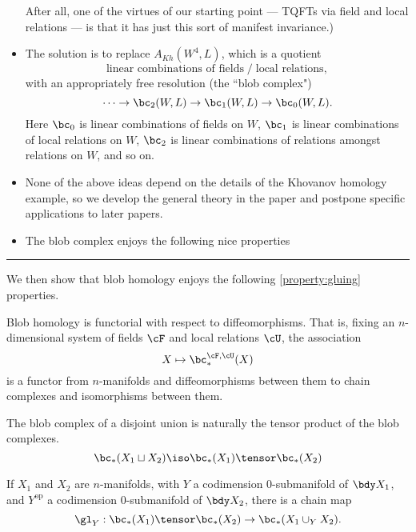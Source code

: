 \documentclass[11pt,leqno]{amsart}
\begin{document}
\begin{itemize}
After all, one of the virtues of our starting point --- TQFTs via field and local relations ---
is that it has just this sort of manifest invariance.)
\item The solution is to replace $A_{Kh}(W^4, L)$, which is a quotient
\[
 \text{linear combinations of fields} \;\big/\; \text{local relations} ,
\]
with an appropriately free resolution (the ``blob complex")
\[
	\cdots\to \bc_2(W, L) \to \bc_1(W, L) \to \bc_0(W, L) .
\]
Here $\bc_0$ is linear combinations of fields on $W$,
$\bc_1$ is linear combinations of local relations on $W$,
$\bc_2$ is linear combinations of relations amongst relations on $W$,
and so on.
\item None of the above ideas depend on the details of the Khovanov homology example,
so we develop the general theory in the paper and postpone specific applications
to later papers.
\item The blob complex enjoys the following nice properties 
\end{itemize}

\bigskip
\hrule
\bigskip

We then show that blob homology enjoys the following
\ref{property:gluing} properties.

\begin{property}[Functoriality]
\label{property:functoriality}%
Blob homology is functorial with respect to diffeomorphisms. That is, fixing an $n$-dimensional system of fields $\cF$ and local relations $\cU$, the association
\begin{equation*}
X \mapsto \bc_*^{\cF,\cU}(X)
\end{equation*}
is a functor from $n$-manifolds and diffeomorphisms between them to chain complexes and isomorphisms between them.
\end{property}

\begin{property}
\label{property:disjoint-union}
The blob complex of a disjoint union is naturally the tensor product of the blob complexes.
\begin{equation*}
\bc_*(X_1 \du X_2) \iso \bc_*(X_1) \tensor \bc_*(X_2)
\end{equation*}
\end{property}

\begin{property}
\label{property:gluing-map}%
If $X_1$ and $X_2$ are $n$-manifolds, with $Y$ a codimension $0$-submanifold of $\bdy X_1$, and $Y^{\text{op}}$ a codimension $0$-submanifold of $\bdy X_2$,
there is a chain map
\begin{equation*}
\gl_Y: \bc_*(X_1) \tensor \bc_*(X_2) \to \bc_*(X_1 \cup_Y X_2).
\end{equation*}
\end{property}
\end{document}
